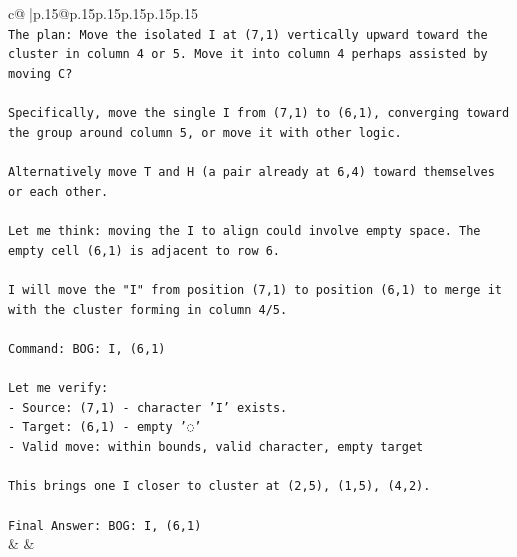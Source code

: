 \documentclass{article}
\begin{document}
{\begin{supertabular}{c@{$\;$}|p{.15\linewidth}@{}p{.15\linewidth}p{.15\linewidth}p{.15\linewidth}p{.15\linewidth}p{.15\linewidth}}
{{{\\ 
\texttt{The plan: Move the isolated I at (7,1) vertically upward toward the cluster in column 4 or 5. Move it into column 4 perhaps assisted by moving C?} \\
\\ 
\texttt{Specifically, move the single I from (7,1) to (6,1), converging toward the group around column 5, or move it with other logic.} \\
\\ 
\texttt{Alternatively move T and H (a pair already at 6,4) toward themselves or each other.} \\
\\ 
\texttt{Let me think: moving the I to align could involve empty space. The empty cell (6,1) is adjacent to row 6.} \\
\\ 
\texttt{I will move the "I" from position (7,1) to position (6,1) to merge it with the cluster forming in column 4/5.} \\
\\ 
\texttt{Command: BOG: I, (6,1)} \\
\\ 
\texttt{Let me verify:} \\
\texttt{{-} Source: (7,1) {-} character 'I' exists.} \\
\texttt{{-} Target: (6,1) {-} empty '◌' } \\
\texttt{{-} Valid move: within bounds, valid character, empty target} \\
\\ 
\texttt{This brings one I closer to cluster at (2,5), (1,5), (4,2).} \\
\\ 
\texttt{Final Answer: BOG: I, (6,1)} \\
            }
        }
    }
    & & \\ \\


\end{supertabular}}
\end{document}
